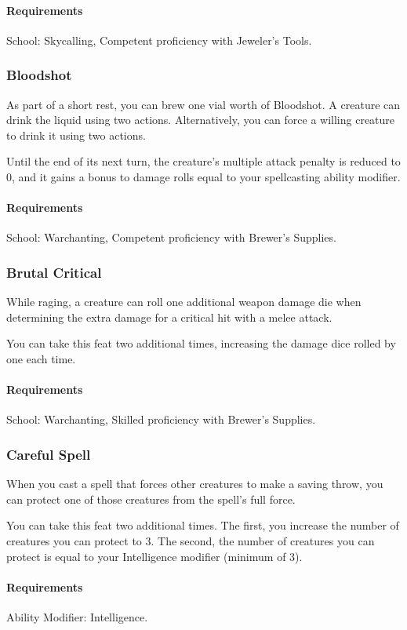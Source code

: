     \paragraph{Requirements} School: Skycalling, Competent proficiency with Jeweler's Tools.
\subsubsection{Bloodshot} \label{feat::bloodshot}
    As part of a short rest, you can brew one vial worth of Bloodshot.
    A creature can drink the liquid using two actions.
    Alternatively, you can force a willing creature to drink it using two actions.

    Until the end of its next turn, the creature's multiple attack penalty is reduced to 0, and it gains a bonus to damage rolls equal to your spellcasting ability modifier.
    \paragraph{Requirements} School: Warchanting, Competent proficiency with Brewer's Supplies.
\subsubsection{Brutal Critical} \label{feat::brutalcritical}
    While raging, a creature can roll one additional weapon damage die when determining the extra damage for a critical hit with a melee attack.

    You can take this feat two additional times, increasing the damage dice rolled by one each time.
    \paragraph{Requirements} School: Warchanting, Skilled proficiency with Brewer's Supplies.
\subsubsection{Careful Spell} \label{feat::carefulspell}
    When you cast a spell that forces other creatures to make a saving throw, you can protect one of those creatures from the spell's full force.

    You can take this feat two additional times.
    The first, you increase the number of creatures you can protect to 3.
    The second, the number of creatures you can protect is equal to your Intelligence modifier (minimum of 3).
    \paragraph{Requirements} Ability Modifier: Intelligence.
